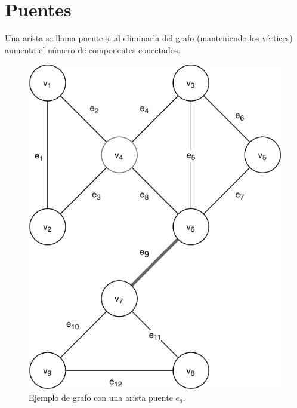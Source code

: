 \section{Puentes}\label{bridges}
Una arista se llama puente si al eliminarla del grafo (manteniendo los vértices) aumenta el número de componentes conectados.

\begin{figure}[H]
	\centering
	\includegraphics[width=0.4\linewidth]{document/ArticulationPoints/images/example-of-bridge}
	\caption{Ejemplo de grafo con una arista puente \( e_9 \).}
	\label{fig:connected-disconnected-graph}
\end{figure}
